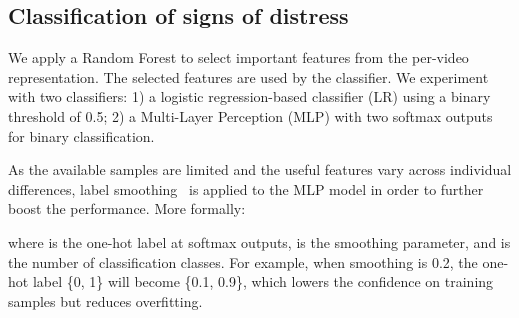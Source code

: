 \vspace{-0.1cm}
\subsection{Classification of signs of distress} \label{sec:Distress_classification}
We apply a Random Forest to select important features from the per-video representation. The selected features are used by the classifier. We experiment with two classifiers: 1) a logistic regression-based classifier (LR) using a binary threshold of 0.5; 2) a Multi-Layer Perception (MLP) with two softmax outputs for binary classification.

As the available samples are limited and the useful features vary across individual differences, label smoothing~\cite{muller2019does} is applied to the MLP model in order to further boost the performance. 
More formally:

where  is the one-hot label at softmax outputs,  is the smoothing parameter, and  is the number of classification classes.
For example, when smoothing is 0.2, the one-hot label \{0, 1\} will become \{0.1, 0.9\}, which lowers the confidence on training samples but reduces overfitting.
